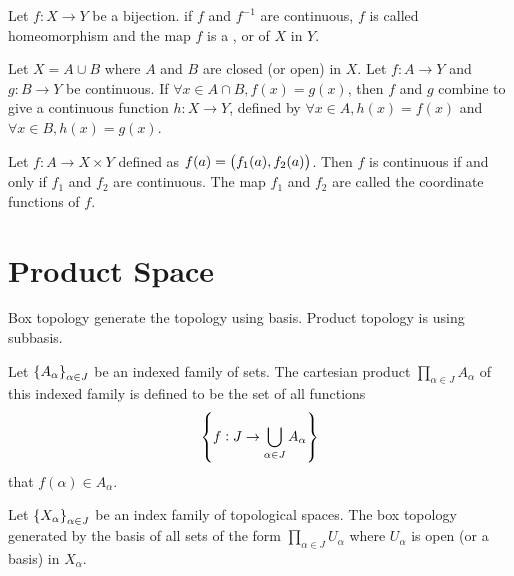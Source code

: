 \begin{definition}
    Let $f:X \rightarrow Y$ be a bijection. if $f$ and $f^{-1}$ are continuous, $f$ is called homeomorphism and the map $f$ is a , or  of $X$ in $Y$.
\end{definition}


\begin{theorem}
    Let $X = A \cup B$ where $A$ and $B$ are closed (or open) in $X$. Let $f: A \rightarrow Y$ and $g: B \rightarrow Y$ be continuous. If $\forall x \in A \cap B, f(x) = g(x)$, then $f$ and $g$ combine to give a continuous function $h: X \rightarrow Y$, defined by $\forall x \in A, h(x) = f(x) $ and $\forall x \in B , h(x) = g(x)$.
\end{theorem}

\begin{theorem}
Let $f: A \rightarrow X \times Y$ defined as $f(a) = \mleft(f_1(a), f_2(a) \mright)$. Then $f$ is continuous if and only if $f_1$ and $f_2$ are continuous. The map $f_1$ and $f_2$ are called the coordinate functions of $f$.
\end{theorem}


\section{Product Space}

Box topology generate the topology using basis. Product topology is using subbasis.
    
\begin{definition}
    Let $\set{A_{\alpha}}_{\alpha \in J}$ be an indexed family of sets. The cartesian product $\displaystyle \prod_{\alpha \in J} A_{\alpha}$ of this indexed family is defined to be the set of all functions 
    \begin{equation}
        \set{f : J \rightarrow \bigcup_{\alpha \in J} A_{\alpha}}
    \end{equation}
    that $f(\alpha) \in A_{\alpha}$.
\end{definition}

\begin{definition}
    Let $\set{X_{\alpha}}_{\alpha \in J}$ be an index family of topological spaces. The box topology generated by the basis of all sets of the form $\displaystyle \prod_{\alpha \in J} U_{\alpha}$ where $U_{\alpha}$ is open (or a basis) in $X_{\alpha}$. 
\end{definition}

